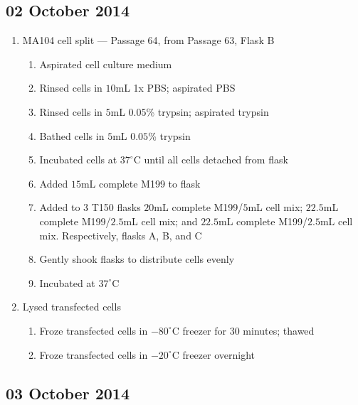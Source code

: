 
\subsection*{02 October 2014}

\begin{enumerate}
	\item MA104 cell split --- Passage 64, from Passage 63, Flask B
		\begin{enumerate}
			\item Aspirated cell culture medium
			\item Rinsed cells in $10$mL 1x PBS; aspirated PBS
			\item Rinsed cells in $5$mL $0.05$\% trypsin; aspirated trypsin
			\item Bathed cells in $5$mL $0.05$\% trypsin
			\item Incubated cells at $37^{\circ}$C until all cells detached from flask
			\item Added $15$mL complete M199 to flask
			\item Added to $3$ T150 flasks $20$mL complete M199/$5$mL cell mix; $22.5$mL complete M199/$2.5$mL cell mix; and $22.5$mL complete M199/$2.5$mL cell mix. Respectively, flasks A, B, and C
			\item Gently shook flasks to distribute cells evenly
			\item Incubated at $37^{\circ}$C
		\end{enumerate}
	\item Lysed transfected cells
		\begin{enumerate}
			\item Froze transfected cells in $-80^{\circ}$C freezer for 30 minutes; thawed
			\item Froze transfected cells in $-20^{\circ}$C freezer overnight
		\end{enumerate}
\end{enumerate}


\subsection*{03 October 2014}
